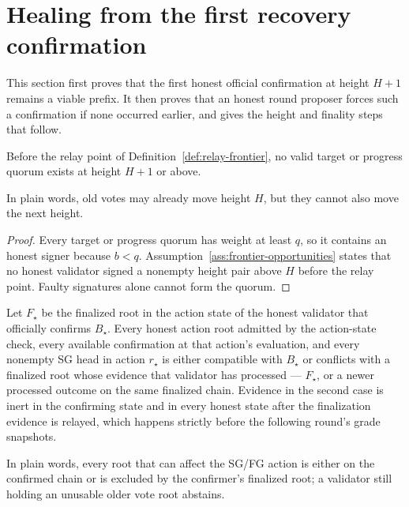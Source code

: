 \section{Healing from the first recovery confirmation}\label{sec:healing}

This section first proves that the first honest official confirmation at
height \(H+1\) remains a viable prefix.  It then proves that an honest round
proposer forces such a confirmation if none occurred earlier, and gives the
height and finality steps that follow.

\begin{lemma}
\label{lem:no-hidden-h-advance}
Before the relay point of Definition~\ref{def:relay-frontier}, no
valid target or progress quorum exists at height \(H+1\) or above.

In plain words, old votes may already move height \(H\), but they cannot also
move the next height.
\end{lemma}

\begin{proof}
Every target or progress quorum has weight at least \(q\), so it contains an
honest signer because \(b<q\).  Assumption~\ref{ass:frontier-opportunities}
states that no honest validator signed a nonempty height pair above \(H\)
before the relay point.  Faulty signatures alone cannot form the quorum.
\end{proof}

\begin{lemma}
\label{lem:first-confirmation-heads}
Let \(F_\star\) be the finalized root in the action state of the honest
validator that officially confirms \(B_\star\).  Every honest action root
admitted by the action-state check, every available confirmation at that
action's evaluation, and every nonempty SG head in action
\(r_\star\) is either compatible with \(B_\star\) or conflicts with a
finalized root whose evidence that validator has processed ---
\(F_\star\), or a newer processed outcome on the same finalized chain.
Evidence in the second case is inert in the confirming state
and in every honest state after the finalization evidence is relayed,
which happens strictly before the following round's grade snapshots.

In plain words, every root that can affect the SG/FG action is either on the
confirmed chain or is excluded by the confirmer's finalized root; a
validator still holding an unusable older vote root abstains.
\end{lemma}

